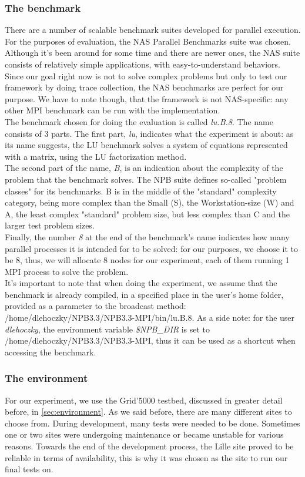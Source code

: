 \subsubsection{The benchmark}
There are a number of scalable benchmark suites developed for parallel
execution. For the purposes of evaluation, the NAS Parallel Benchmarks
suite\cite{jfy99} was chosen. Although it's been around for some time
and there are newer ones, the NAS suite consists of relatively simple
applications, with easy-to-understand behaviors. Since our goal right
now is not to solve complex problems but only to test our framework by
doing trace collection, the NAS benchmarks are perfect for our
purpose. We have to note though, that the framework is not
NAS-specific: any other MPI benchmark can be run with the
implementation.\\[0.3cm]
The benchmark chosen for doing the evaluation is
called \emph{lu.B.8}. The name consists of 3 parts. The first
part, \emph{lu}, indicates what the experiment is about: as its name
suggests, the LU benchmark solves a system of equations represented
with a matrix, using the LU factorization method.\\[0.3cm]
The second part of the name, \emph{B}, is an
indication about the complexity of the problem that the benchmark
solves. The NPB suite defines so-called "problem classes" for its
benchmarks. B is in the middle of the "standard" complexity category,
being more complex than the Small (S), the Workstation-size (W) and A,
the least complex "standard" problem size, but less complex than C and
the larger test problem sizes.\cite{d13}\\[0.3cm]
Finally, the number \emph{8} at the end of the benchmark's name
indicates how many parallel processes it is intended for to be solved:
for our purposes, we choose it to be 8, thus, we will allocate 8 nodes
for our experiment, each of them running 1 MPI process to solve the
problem.\\[0.3cm]
It's important to note that when doing the experiment, we assume that
the benchmark is already compiled, in a specified place in the user's
home folder, provided as a parameter to the broadcast method:
/home/dlehoczky/NPB3.3/NPB3.3-MPI/bin/lu.B.8. As a side note: for the
user \emph{dlehoczky}, the environment variable \emph{\$NPB\_DIR} is
set to /home/dlehoczky/NPB3.3/NPB3.3-MPI, thus it can be used as a
shortcut when accessing the benchmark.
\subsubsection{The environment}
For our experiment, we use the Grid'5000 testbed, discussed in greater
detail before, in \ref{sec:environment}. As we said before, there are
many different sites to choose from. During development,
many tests were needed to be done. Sometimes one or two sites were
undergoing maintenance or became unstable for various reasons. Towards
the end of the development process, the Lille site proved to be
reliable in terms of availability, this is why it was chosen as the
site to run our final tests on.
